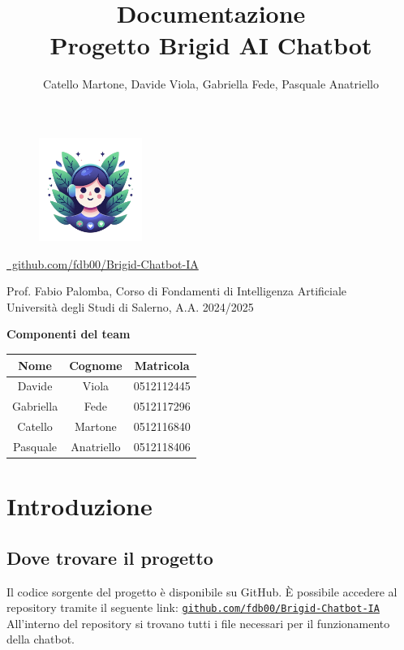 \documentclass[12pt, letterpaper]{article}
\title{\Huge \textbf{Documentazione}\\[0.5cm]
\Large \textbf{Progetto Brigid AI Chatbot}}
\author{\large Catello Martone, Davide Viola, Gabriella Fede, Pasquale Anatriello}
\begin{document}
	
\begin{figure}[t]
\centering
\includegraphics[width=0.3\textwidth]{immagini/brigid.png}
\end{figure}
	
\maketitle
\begin{center}
\href{https://github.com/fdb00/Brigid-Chatbot-IA}{\scalebox{0.9}{\faGithub}~github.com/fdb00/Brigid-Chatbot-IA}
\end{center}

\vfill
\begin{center}
Prof. Fabio Palomba, Corso di Fondamenti di Intelligenza Artificiale\\
Università degli Studi di Salerno, A.A. 2024/2025
\end{center}
	
	
\newpage
{\Large \textbf{Componenti del team}}
\begin{table}[h]
	\centering
	\large %
	\begin{tabular}{|c|c|c|}
		\hline
		\textbf{Nome} & \textbf{Cognome} & \textbf{Matricola} \\
		\hline
		Davide  & Viola      & 0512112445 \\
		Gabriella & Fede      & 0512117296 \\
		Catello  & Martone    & 0512116840 \\
		Pasquale & Anatriello & 0512118406 \\
		\hline
	\end{tabular}
	\label{tab:studenti}
\end{table}
\newpage
\tableofcontents
\newpage
	
\section{Introduzione}
	
\subsection{Dove trovare il progetto}
Il codice sorgente del progetto è disponibile su GitHub. È possibile accedere al repository tramite il seguente link:  
\noindent\href{https://github.com/fdb00/Brigid-Chatbot-IA.git}{\texttt{github.com/fdb00/Brigid-Chatbot-IA}}\\
All'interno del repository si trovano tutti i file necessari per il funzionamento della chatbot.
\end{document}
